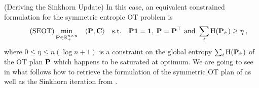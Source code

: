 \begin{remark}{(Deriving the Sinkhorn Update)}
In this case, an equivalent constrained formulation for the symmetric entropic OT problem is
\begin{equation}
\tag{SEOT}
\label{eq:entropy_constrained_OT}
\min_{\mathbf{P} \in \mathbb{R}_{+}^{n \times n}} \quad \langle \mathbf{P}, \mathbf{C} \rangle \quad \text{s.t.} \quad \mathbf{P} \bm{1} = \bm{1}, \: \mathbf{P} = \mathbf{P}^\top \text{ and } \sum_i \operatorname{H}(\mathbf{P}_{i:}) \geq \eta \:,
\end{equation}
where $0 \leq \eta \leq n (\log n + 1)$ is a constraint on the global entropy $\sum_i \operatorname{H}(\mathbf{P}_{i:})$ of the OT plan $\mathbf{P}$ which happens to be saturated at optimum. We are going to see in what follows how to retrieve the formulation of the symmetric OT plan of  as well as the Sinkhorn iteration from .


\end{remark}
